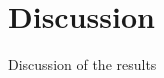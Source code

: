 \documentclass[Thesis.tex]{subfiles}
\begin{document}
\setcounter{section}{3}

\section{Discussion}
\label{sec:dis}
Discussion of the results
\end{document}
